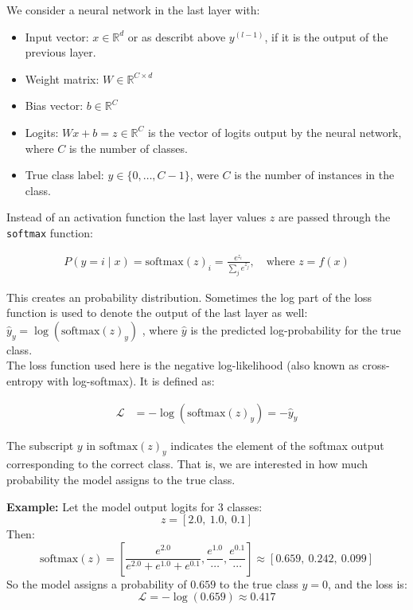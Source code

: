 We consider a neural network in the last layer with:

\begin{itemize}
	\item Input vector: $x \in \mathbb{R}^d$ or as describt above $y^{(l-1)}$, if it is the output of the previous layer.
	\item Weight matrix: $W \in \mathbb{R}^{C \times d}$
	\item Bias vector: $b \in \mathbb{R}^{C}$
	\item Logits: $Wx + b = z \in \mathbb{R}^{C}$  is the vector of logits output by the neural network, where $C$ is the number of classes.
	\item True class label: $y \in \{0, \dots, C{-}1\}$, were $C$ is the number of instances in the class.
\end{itemize}

Instead of an activation function the last layer values $z$ are passed through the  \texttt{softmax} function:

\begin{align}
	P(y = i \mid x) = \text{softmax}(z)_i = \frac{e^{z_i}}{\sum_j e^{z_j}}, \quad \text{where } z = f(x)
\end{align}

This creates an probability distribution. Sometimes the log part of the loss function is used to denote the output of the last layer as well: $\hat{y}_y = \log \left( \text{softmax}(z)_y \right)$ , where $\hat{y}$ is the predicted log-probability for the true class.\\

The loss function used here is the negative log-likelihood (also known as cross-entropy with log-softmax). It is defined as:

\begin{align}
	\mathcal{L} &= -\log \left( \text{softmax}(z)_y \right) = -\hat{y}_y
\end{align}

The subscript $y$ in $\text{softmax}(z)_y$ indicates the element of the softmax output corresponding to the correct class. That is, we are interested in how much probability the model assigns to the true class.

\textbf{Example:} Let the model output logits for 3 classes:
\[
z = [2.0,\ 1.0,\ 0.1]
\]
Then:
\[
\text{softmax}(z) = \left[ \frac{e^{2.0}}{e^{2.0}+e^{1.0}+e^{0.1}}, \frac{e^{1.0}}{\cdots}, \frac{e^{0.1}}{\cdots} \right] \approx [0.659,\ 0.242,\ 0.099]
\]
So the model assigns a probability of $0.659$ to the true class $y = 0$, and the loss is:
\[
\mathcal{L} = -\log(0.659) \approx 0.417
\]


